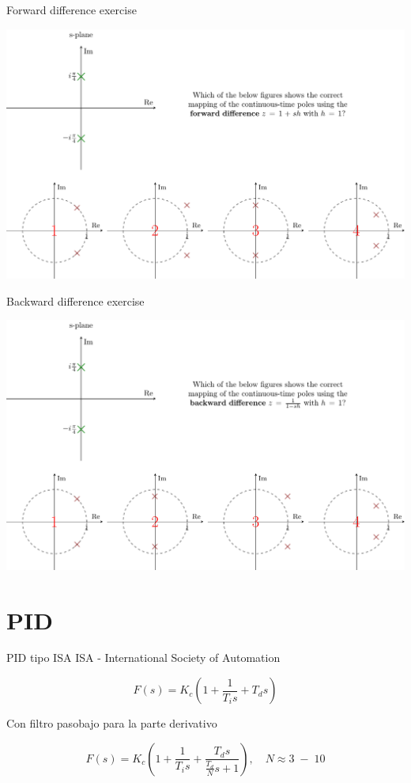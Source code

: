 \documentclass[presentation,aspectratio=1610]{beamer}
\begin{document}
\begin{frame}[label={sec:org6b5f7e5}]{Forward difference exercise}
\begin{center}
\includegraphics[width=\linewidth]{../../figures/forward-diff-exercise}
\end{center}
\end{frame}
\begin{frame}[label={sec:org81ecf42}]{Backward difference exercise}
\begin{center}
\includegraphics[width=\linewidth]{../../figures/backward-diff-exercise}
\end{center}
\end{frame}


\section{PID}
\label{sec:orgb8042ca}
\begin{frame}[label={sec:orgd473c6a}]{PID tipo ISA}
ISA - International Society of Automation

\[ F(s) = K_c\left( 1 + \frac{1}{T_i s} + T_d s\right) \]

Con filtro pasobajo para la parte derivativo

\[ F(s) = K_c\left( 1 + \frac{1}{T_i s} + \frac{T_d s}{\frac{T_d}{N} s + 1}\right), \quad N \approx 3\; - \; 10 \]
\end{frame}
\end{document}
